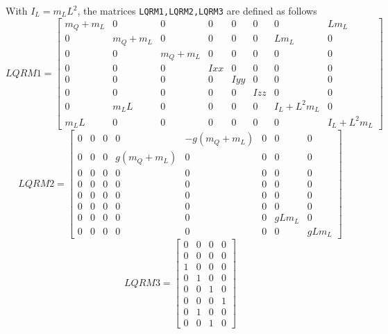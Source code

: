 With $ I_L = m_LL^2$, the matrices \texttt{LQRM1,LQRM2,LQRM3} are defined as follows
\begin{equation}\label{key}
LQRM1 = 
\begin{bmatrix}
m_Q+m_L&0&0&0&0&0&0&Lm_L\\%
0&m_Q+m_L&0&0&0&0&Lm_L&0\\%
0&0&m_Q+m_L&0&0&0&0&0\\%
0&0&0&Ixx&0&0&0&0\\%
0&0&0&0&Iyy&0&0&0\\%
0&0&0&0&0&Izz&0&0\\%
0&m_LL&0&0&0&0&I_L+L^2m_L&0\\%
m_LL&0&0&0&0&0&0&I_L+L^2m_L%
\end{bmatrix}
\end{equation}
\begin{equation}\label{key}
LQRM2 =
\begin{bmatrix}
0&0&0&0&-g(m_Q+m_L)&0&0&0\\%
0&0&0&g(m_Q+m_L)&0&0&0&0\\%
0&0&0&0&0&0&0&0\\%
0&0&0&0&0&0&0&0\\%
0&0&0&0&0&0&0&0\\%
0&0&0&0&0&0&0&0\\%
0&0&0&0&0&0&gLm_L&0\\%
0&0&0&0&0&0&0&gLm_L%
\end{bmatrix}
\end{equation}
\begin{equation}\label{key}
LQRM3  =
\begin{bmatrix}
0&0&0&0\\%
0&0&0&0\\%
1&0&0&0\\%
0&1&0&0\\%
0&0&1&0\\%
0&0&0&1\\%
0&1&0&0\\%
0&0&1&0%
\end{bmatrix}
\end{equation}

